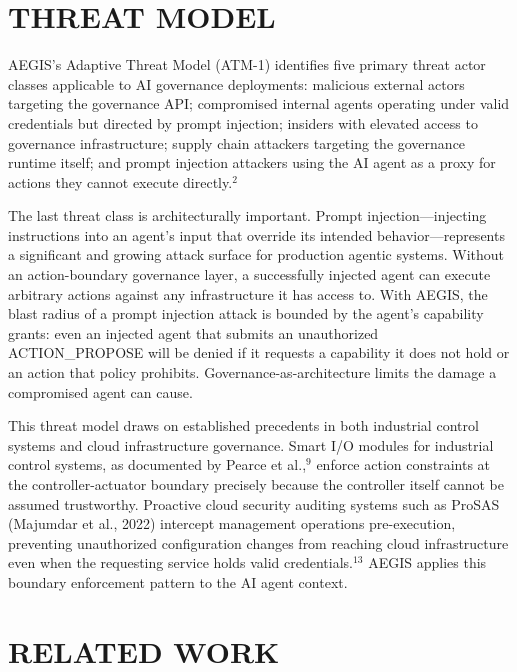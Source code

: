 \documentclass{IEEEcsmag}
\begin{document}
\section{THREAT MODEL}

AEGIS's Adaptive Threat Model (ATM-1) identifies five primary threat actor classes applicable to AI governance deployments: malicious external actors targeting the governance API; compromised internal agents operating under valid credentials but directed by prompt injection; insiders with elevated access to governance infrastructure; supply chain attackers targeting the governance runtime itself; and prompt injection attackers using the AI agent as a proxy for actions they cannot execute directly.$^{2}$

The last threat class is architecturally important. Prompt injection---injecting instructions into an agent's input that override its intended behavior---represents a significant and growing attack surface for production agentic systems. Without an action-boundary governance layer, a successfully injected agent can execute arbitrary actions against any infrastructure it has access to. With AEGIS, the blast radius of a prompt injection attack is bounded by the agent's capability grants: even an injected agent that submits an unauthorized ACTION\_PROPOSE will be denied if it requests a capability it does not hold or an action that policy prohibits. Governance-as-architecture limits the damage a compromised agent can cause.

This threat model draws on established precedents in both industrial control systems and cloud infrastructure governance. Smart I/O modules for industrial control systems, as documented by Pearce et al.,$^{9}$ enforce action constraints at the controller-actuator boundary precisely because the controller itself cannot be assumed trustworthy. Proactive cloud security auditing systems such as ProSAS (Majumdar et al., 2022) intercept management operations pre-execution, preventing unauthorized configuration changes from reaching cloud infrastructure even when the requesting service holds valid credentials.$^{13}$ AEGIS applies this boundary enforcement pattern to the AI agent context.

\section{RELATED WORK}
\end{document}
